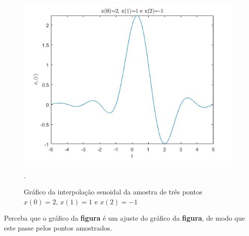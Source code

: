 \documentclass[a4paper, 12pt]{article}
\begin{document}


\begin{figure}[H]
	\centering
	\includegraphics[scale=0.6]{../Imagens/ex6/c.jpg} 
	\caption{Gráfico da interpolação senoidal da amostra de três pontos $x(0)=2$, $x(1)=1$ e $x(2)=-1$}.
	\label{fig:6c}
\end{figure}

Perceba que o gráfico da \textbf{figura} é um ajuste do gráfico da \textbf{figura}, de modo que este passe pelos pontos amostrados.
\end{document}
